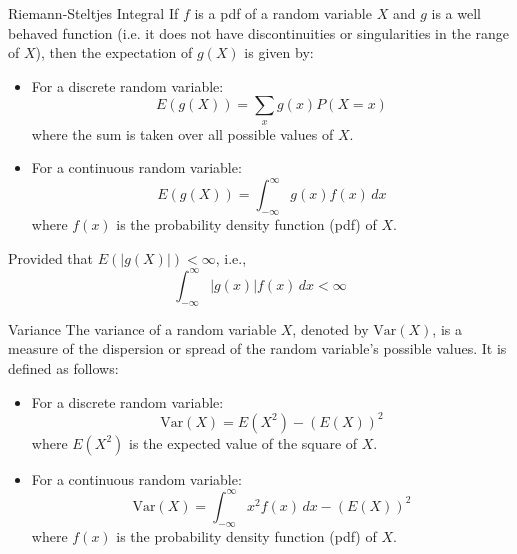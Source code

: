 \documentclass[openany]{book}
\begin{document}
\begin{mydefinition}{Riemann-Steltjes Integral}
    If $f$ is a pdf of a random variable $X$ and $g$ is a well behaved function (i.e. it does not have discontinuities or singularities in the range of $X$), then the expectation of $g(X)$ is given by:
    \begin{itemize}
        \item For a discrete random variable:
        $$E(g(X)) = \sum_{x} g(x) P(X = x)$$
        where the sum is taken over all possible values of $X$.
        \item For a continuous random variable:
        $$E(g(X)) = \int_{-\infty}^{\infty} g(x) f(x) \, dx$$
        where $f(x)$ is the probability density function (pdf) of $X$.
    \end{itemize}
    Provided that $E(|g(X)|) < \infty$, i.e., $$\int_{-\infty}^{\infty} |g(x)| f(x) \, dx < \infty$$
\end{mydefinition}
\begin{mydefinition}{Variance}
    The variance of a random variable $X$, denoted by $\text{Var}(X)$, is a measure of the dispersion or spread of the random variable's possible values. It is defined as follows:
    \begin{itemize}
        \item For a discrete random variable:
        $$\text{Var}(X) = E(X^2) - (E(X))^2$$
        where $E(X^2)$ is the expected value of the square of $X$.
        \item For a continuous random variable:
        $$\text{Var}(X) = \int_{-\infty}^{\infty} x^2 f(x) \, dx - (E(X))^2$$
        where $f(x)$ is the probability density function (pdf) of $X$.
    \end{itemize}
\end{mydefinition}
\end{document}
